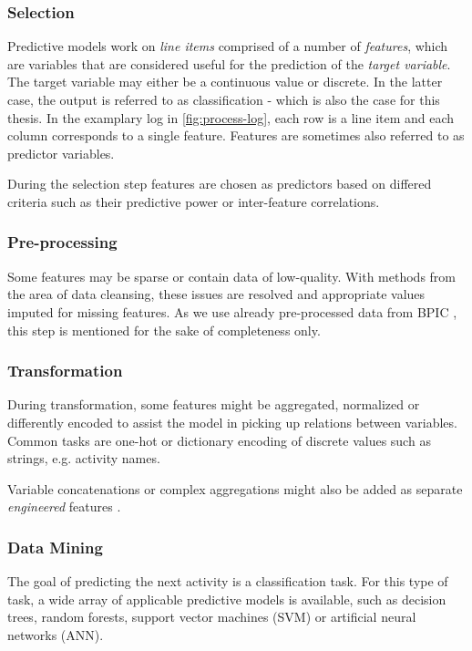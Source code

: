\subsubsection*{Selection}
Predictive models work on \textit{line items} comprised of a number of \textit{features}, which are variables that are considered useful for the prediction of the \textit{target variable}. The target variable may either be a continuous value or discrete. In the latter case, the output is referred to as classification - which is also the case for this thesis.
In the examplary log in \autoref{fig:process-log}, each row is a line item and each column corresponds to a single feature. Features are sometimes also referred to as predictor variables.

During the selection step features are chosen as predictors based on differed criteria such as their predictive power or inter-feature correlations.

\subsubsection*{Pre-processing}
Some features may be sparse or contain data of low-quality. With methods from the area of data cleansing, these issues are resolved and appropriate values imputed for missing features. As we use already pre-processed data from BPIC \cite{BPIC2011, BPIC2012, BPIC2017}, this step is mentioned for the sake of completeness only.

\subsubsection*{Transformation}
\label{sec:predictive-model-development:transformation}
During transformation, some features might be aggregated, normalized or differently encoded to assist the model in picking up relations between variables. Common tasks are one-hot or dictionary encoding of discrete values such as strings, e.g. activity names.

Variable concatenations or complex aggregations might also be added as separate \textit{engineered} features \cite{schoenig2018}.

\subsubsection*{Data Mining}
The goal of predicting the next activity is a classification task. For this type of task, a wide array of applicable predictive models is available, such as decision trees, random forests, support vector machines (SVM) or artificial neural networks (ANN).

